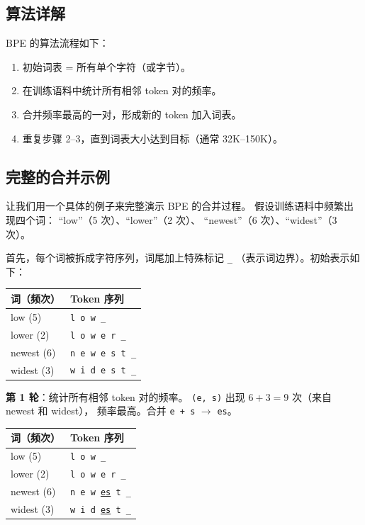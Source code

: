 \subsection{算法详解}

BPE 的算法流程如下：
\begin{enumerate}[noitemsep]
  \item 初始词表 = 所有单个字符（或字节）。
  \item 在训练语料中统计所有相邻 token 对的频率。
  \item 合并频率最高的一对，形成新的 token 加入词表。
  \item 重复步骤 2--3，直到词表大小达到目标（通常 32K--150K）。
\end{enumerate}

\subsection{完整的合并示例}

让我们用一个具体的例子来完整演示 BPE 的合并过程。
假设训练语料中频繁出现四个词：
``low''（5 次）、``lower''（2 次）、
``newest''（6 次）、``widest''（3 次）。

首先，每个词被拆成字符序列，词尾加上特殊标记 \texttt{\_}
（表示词边界）。初始表示如下：

\begin{center}
\small
\begin{tabular}{ll}
\hline
\textbf{词（频次）} & \textbf{Token 序列} \\
\hline
low (5)    & \texttt{l o w \_} \\
lower (2)  & \texttt{l o w e r \_} \\
newest (6) & \texttt{n e w e s t \_} \\
widest (3) & \texttt{w i d e s t \_} \\
\hline
\end{tabular}
\end{center}

\textbf{第 1 轮}：统计所有相邻 token 对的频率。
\texttt{(e, s)} 出现 $6 + 3 = 9$ 次（来自 newest 和 widest），
频率最高。合并 \texttt{e + s} $\to$ \texttt{es}。

\begin{center}
\small
\begin{tabular}{ll}
\hline
\textbf{词（频次）} & \textbf{Token 序列} \\
\hline
low (5)    & \texttt{l o w \_} \\
lower (2)  & \texttt{l o w e r \_} \\
newest (6) & \texttt{n e w \underline{es} t \_} \\
widest (3) & \texttt{w i d \underline{es} t \_} \\
\hline
\end{tabular}
\end{center}

